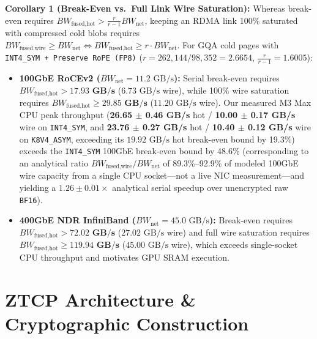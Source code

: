 \documentclass[10pt,twocolumn]{article}
\begin{document}
\textbf{Corollary 1 (Break-Even vs.\ Full Link Wire Saturation):} Whereas break-even requires $BW_{\text{fused,hot}} > \frac{r}{r-1} BW_{\text{net}}$, keeping an RDMA link 100\% saturated with compressed cold blobs requires $BW_{\text{fused,wire}} \ge BW_{\text{net}} \iff BW_{\text{fused,hot}} \ge r \cdot BW_{\text{net}}$. For GQA cold pages with \texttt{INT4\_SYM + Preserve RoPE (FP8)} ($r = 262,144 / 98,352 = 2.6654$, $\frac{r}{r-1} = 1.6005$):
\begin{itemize}
    \item \textbf{100GbE RoCEv2 ($BW_{\text{net}} = 11.2\text{ GB/s}$):} Serial break-even requires $BW_{\text{fused,hot}} > \mathbf{17.93\text{ GB/s}}$ ($6.73\text{ GB/s}$ wire), while 100\% wire saturation requires $BW_{\text{fused,hot}} \ge \mathbf{29.85\text{ GB/s}}$ ($11.20\text{ GB/s}$ wire). Our measured M3 Max CPU peak throughput (\textbf{26.65 $\pm$ 0.46 GB/s} hot / \textbf{10.00 $\pm$ 0.17 GB/s} wire on \texttt{INT4\_SYM}, and \textbf{23.76 $\pm$ 0.27 GB/s} hot / \textbf{10.40 $\pm$ 0.12 GB/s} wire on \texttt{K8V4\_ASYM}, exceeding its $19.92\text{ GB/s}$ hot break-even bound by 19.3\%) exceeds the \texttt{INT4\_SYM} 100GbE break-even bound by 48.6\% (corresponding to an analytical ratio $BW_{\text{fused,wire}} / BW_{\text{net}}$ of 89.3\%--92.9\% of modeled 100GbE wire capacity from a single CPU socket---not a live NIC measurement---and yielding a $1.26 \pm 0.01\times$ analytical serial speedup over unencrypted raw \texttt{BF16}).
    \item \textbf{400GbE NDR InfiniBand ($BW_{\text{net}} = 45.0\text{ GB/s}$):} Break-even requires $BW_{\text{fused,hot}} > \mathbf{72.02\text{ GB/s}}$ ($27.02\text{ GB/s}$ wire) and full wire saturation requires $BW_{\text{fused,hot}} \ge \mathbf{119.94\text{ GB/s}}$ ($45.00\text{ GB/s}$ wire), which exceeds single-socket CPU throughput and motivates GPU SRAM execution.
\end{itemize}

\section{ZTCP Architecture \& Cryptographic Construction}
\end{document}
